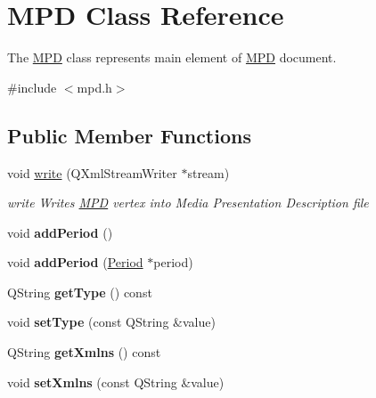 \hypertarget{class_m_p_d}{\section{M\-P\-D Class Reference}
\label{class_m_p_d}
}


The \hyperlink{class_m_p_d}{M\-P\-D} class represents main element of \hyperlink{class_m_p_d}{M\-P\-D} document.  




{\ttfamily \#include $<$mpd.\-h$>$}

\subsection*{Public Member Functions}
\begin{DoxyCompactItemize}
\item 
void \hyperlink{class_m_p_d_a07c1991933d680f2a7843ce2f6a2c872}{write} (Q\-Xml\-Stream\-Writer $\ast$stream)
\begin{DoxyCompactList}\small\item\em write Writes \hyperlink{class_m_p_d}{M\-P\-D} vertex into Media Presentation Description file \end{DoxyCompactList}\item 
\hypertarget{class_m_p_d_abef22bc61326c9cab64b3c81f20c2ed4}{void {\bfseries add\-Period} ()}\label{class_m_p_d_abef22bc61326c9cab64b3c81f20c2ed4}

\item 
\hypertarget{class_m_p_d_a7db11aa6e893900945dfab48a49badf4}{void {\bfseries add\-Period} (\hyperlink{class_period}{Period} $\ast$period)}\label{class_m_p_d_a7db11aa6e893900945dfab48a49badf4}

\item 
\hypertarget{class_m_p_d_a5ea10b02c9a9b987cd925a73c1b76598}{Q\-String {\bfseries get\-Type} () const }\label{class_m_p_d_a5ea10b02c9a9b987cd925a73c1b76598}

\item 
\hypertarget{class_m_p_d_ade3d7bf9b45b7f9e92a07092ff7973e9}{void {\bfseries set\-Type} (const Q\-String \&value)}\label{class_m_p_d_ade3d7bf9b45b7f9e92a07092ff7973e9}

\item 
\hypertarget{class_m_p_d_a3794a668a5e1ec568369b95d87f60f52}{Q\-String {\bfseries get\-Xmlns} () const }\label{class_m_p_d_a3794a668a5e1ec568369b95d87f60f52}

\item 
\hypertarget{class_m_p_d_affdfac3c4819f6fec7a764f6d3de74f6}{void {\bfseries set\-Xmlns} (const Q\-String \&value)}\label{class_m_p_d_affdfac3c4819f6fec7a764f6d3de74f6}


\end{DoxyCompactItemize}
